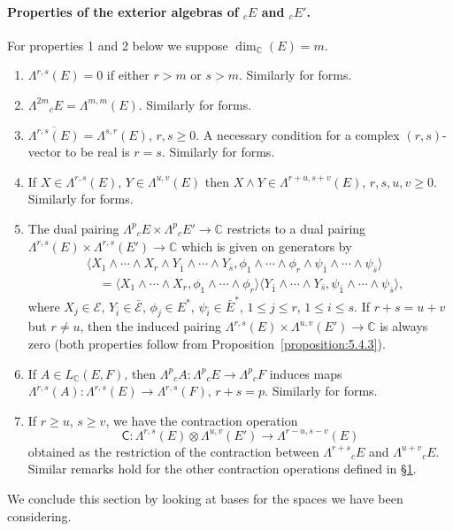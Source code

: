 \paragraph{Properties of the exterior algebras of ${}_cE$ and ${}_cE'$.}
For properties 1 and 2 below we suppose $\dim_{\mathbb C}(E)=m$.
\begin{enumerate}
\item $\Lambda^{r,s}(E)=0$ if either $r>m$ or $s>m$. Similarly for forms.
\item $\Lambda^{2m}{}_cE=\Lambda^{m,m}(E)$. Similarly for forms.
\item $\overline{\Lambda^{r,s}(E)}=\Lambda^{s,r}(E)$, $r,s\geq0$. A necessary condition for a complex $(r,s)$-vector to be real is $r=s$. Similarly for forms.
\item If $X\in\Lambda^{r,s}(E)$, $Y\in\Lambda^{u,v}(E)$ then $X\wedge Y\in\Lambda^{r+u,s+v}(E)$, $r,s,u,v\geq0$. Similarly for forms.
\item The dual pairing $\Lambda^p{}_cE\times\Lambda^p{}_cE'\to\mathbb C$ restricts to a dual pairing $\Lambda^{r,s}(E)\times\Lambda^{r,s}(E')\to\mathbb C$ which is given on generators by
\[
\begin{split}
&\langle X_1\wedge\cdots\wedge X_r\wedge Y_{\bar1}\wedge\cdots\wedge Y_{\bar s},\phi_1\wedge\cdots\wedge\phi_r\wedge\psi_{\bar1}\wedge\cdots\wedge\psi_{\bar s}\rangle\\
&\quad=\langle X_1\wedge\cdots\wedge X_r,\phi_1\wedge\cdots\wedge\phi_r\rangle\langle Y_{\bar1}\wedge\cdots\wedge Y_{\bar s},\psi_{\bar1}\wedge\cdots\wedge\psi_{\bar s}\rangle,
\end{split}
\]
where $X_j\in\mathcal E$, $Y_{\bar i}\in\bar{\mathcal E}$, $\phi_j\in E^*$, $\psi_{\bar i}\in\bar E^*$, $1\leq j\leq r$, $1\leq i\leq s$. If $r+s=u+v$ but $r\neq u$, then the induced pairing $\Lambda^{r,s}(E)\times\Lambda^{u,v}(E')\to\mathbb C$ is always zero (both properties follow from Proposition~\ref{proposition:5.4.3}).
\item If $A\in L_{\mathbb C}(E,F)$, then $\Lambda^p{}_cA:\Lambda^p{}_cE\to\Lambda^p{}_cF$ induces maps $\Lambda^{r,s}(A):\Lambda^{r,s}(E)\to\Lambda^{r,s}(F)$, $r+s=p$. Similarly for forms.
\item If $r\geq u$, $s\geq v$, we have the contraction operation
\[
\mathsf C:\Lambda^{r,s}(E)\otimes\Lambda^{u,v}(E')\longrightarrow\Lambda^{r-u,s-v}(E)
\]
obtained as the restriction of the contraction between $\Lambda^{r+s}{}_cE$ and $\Lambda^{u+v}{}_cE$. Similar remarks hold for the other contraction operations defined in \hyperref[sec:5:1]{\S1}.
\end{enumerate}
We conclude this section by looking at bases for the spaces we have been considering.

